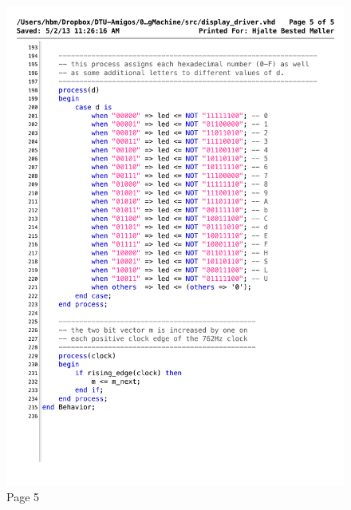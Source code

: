 \begin{figure}[!h]
\centering
\includegraphics[scale=0.7]{figs/display_driver_5.pdf}
\caption{Page 5}
\label{vhd:dispdriv5}
\end{figure}



